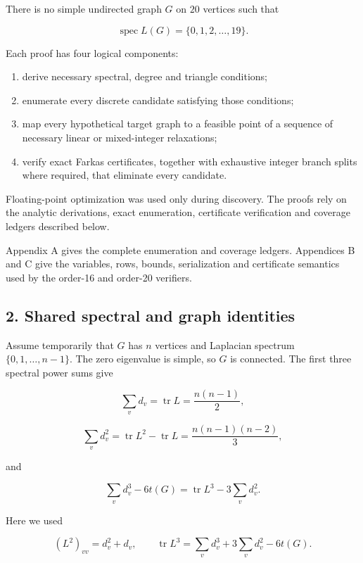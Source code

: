 \documentclass[
  english,
  11pt,
  a4paper,
]{article}
\providecommand{\tightlist}{%
  \setlength{\itemsep}{0pt}\setlength{\parskip}{0pt}}
\begin{document}
There is no simple undirected graph \(G\) on \(20\) vertices such that

\[
\operatorname{spec}L(G)=\{0,1,2,\ldots,19\}.
\]

Each proof has four logical components:

\begin{enumerate}
\def\labelenumi{\arabic{enumi}.}
\tightlist
\item
  derive necessary spectral, degree and triangle conditions;
\item
  enumerate every discrete candidate satisfying those conditions;
\item
  map every hypothetical target graph to a feasible point of a sequence
  of necessary linear or mixed-integer relaxations;
\item
  verify exact Farkas certificates, together with exhaustive integer
  branch splits where required, that eliminate every candidate.
\end{enumerate}

Floating-point optimization was used only during discovery. The proofs
rely on the analytic derivations, exact enumeration, certificate
verification and coverage ledgers described below.

Appendix A gives the complete enumeration and coverage ledgers.
Appendices B and C give the variables, rows, bounds, serialization and
certificate semantics used by the order-16 and order-20 verifiers.

\subsection{2. Shared spectral and graph
identities}\label{shared-spectral-and-graph-identities}

Assume temporarily that \(G\) has \(n\) vertices and Laplacian spectrum
\(\{0,1,\ldots,n-1\}\). The zero eigenvalue is simple, so \(G\) is
connected. The first three spectral power sums give

\[
\sum_v d_v=\operatorname{tr}L=\frac{n(n-1)}2,
\tag{2.1}
\]

\[
\sum_v d_v^2
=\operatorname{tr}L^2-\operatorname{tr}L
=\frac{n(n-1)(n-2)}3,
\tag{2.2}
\]

and

\[
\sum_v d_v^3-6t(G)
=\operatorname{tr}L^3-3\sum_vd_v^2.
\tag{2.3}
\]

Here we used

\[
(L^2)_{vv}=d_v^2+d_v,
\qquad
\operatorname{tr}L^3=\sum_vd_v^3+3\sum_vd_v^2-6t(G).
\]
\end{document}
